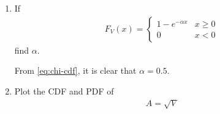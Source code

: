 \documentclass[journal,12pt,twocolumn]{IEEEtran}
\renewcommand\thesection{\arabic{section}}
\begin{document}
\begin{enumerate}[label=\thesection.\arabic*
,ref=\thesection.\theenumi]
\begin{align}
\begin{cases}
				0 & x < 0 
			\end{cases} \label{eq:chi-cdf} \\
			p_V(x) = 
			\begin{cases}
				\frac{1}{2}e^{-\frac{x}{2}} & x \geq 0 \\
				0 & x < 0
			\end{cases} \label{eq:chi-pdf} 
		\end{align}
The equations \eqref{eq:chi-cdf} and \eqref{eq:chi-pdf} have been used to generate the plots. The Python code can be downloaded using
\begin{lstlisting}
$ wget https://raw.githubusercontent.com/goats-9/ai1110-assignments/master/manual/codes/6_1_cdf.py
$ wget https://raw.githubusercontent.com/goats-9/ai1110-assignments/master/manual/codes/6_1_pdf.py
\end{lstlisting}
and run by typing the command
\begin{lstlisting}
$ python3 6_1_cdf.py
$ python3 6_1_pdf.py
\end{lstlisting}

\item If
	\begin{align}
		F_V(x) = 
		\begin{cases}
			1 - e^{-\alpha x} & x \geq 0 \\
			0 & x < 0
		\end{cases}
	\end{align}
find $\alpha$.

\solution
		From \eqref{eq:chi-cdf}, it is clear that $\alpha = 0.5$.

\item Plot the CDF and PDF of 
	\begin{align}
		A = \sqrt{V}
	\end{align}


\end{enumerate}
\end{document}
